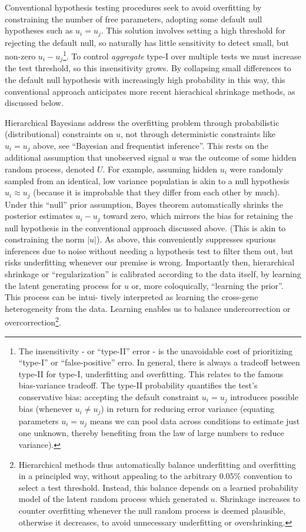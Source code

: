 \documentclass{article}
\begin{document}
Conventional hypothesis testing procedures seek to avoid overfitting by constraining the number of free parameters, adopting some default null hypotheses such as $u_i=u_j$. This solution involves setting a high threshold for rejecting the default null, so naturally has little sensitivity to detect small, but non-zero $u_i-u_j$\footnote{The insensitivity - or ``type-II'' error - is the unavoidable cost of prioritizing ``type-I''  or ``false-positive'' erro. In general, there is always a tradeoff between type-II for type-I, underfitting and overfitting. This relates to the famous bias-variance tradeoff. The type-II probability quantifies the test's conservative bias: accepting the default constraint $u_i=u_j$  introduces possible bias (whenever $u_i \neq u_j$) in return for reducing error variance (equating parameters $u_i=u_j$ means we can pool data across conditions to estimate just one unknown, thereby benefiting from the law of large numbers to reduce variance).}. To control \textit{aggregate} type-I over multiple tests we must increase the test threshold, so this insensitivity grows. By collapsing small differences to the default null hypothesis with increasingly high probability in this way, this conventional approach anticipates more recent hierachical shrinkage methods, as discussed below.

Hierarchical Bayesians address the overfitting problem through probabilistic (distributional) constraints on $u$, not through deterministic constraints like $u_i=u_j$ above, see ``Bayesian and frequentist inference''. This rests on the additional assumption that unobserved signal $u$ was the outcome of some hidden random process, denoted $U$. For example, assuming hidden $u_i$ were randomly sampled from an identical, low variance populatian is akin to a null hypothesis $u_i \approx u_j$ (because it is improbable that they differ from each other by much). Under this ``null'' prior assumption, Bayes theorem automatically shrinks the posterior estimates $u_i-u_j$ toward zero, which mirrors the bias for retaining the null hypothesis in the conventional approach discussed above. (This is akin to constraining the norm $|u|$). As above, this conveniently suppresses spurious inferences due to noise without needing a hypothesis test to filter them out, but risks underfitting whenever our premise is wrong. Importantly then, hierarchical shrinkage or ``regularization'' is calibrated according to the data itself, by learning the latent generating process for $u$  or, more coloquically, ``learning the prior''. This process can be intui- tively interpreted as learning the cross-gene heterogeneity from the data. Learning enables us to balance undercorrection or overcorrection\footnote{Hierarchical methods thus automatically balance underfitting and overfitting in a principled way, without appealing to the arbitrary $0.05\%$ convention to select a test threshold. Instead, this balance depends on a learned probability model of the latent random process which generated $u$. Shrinkage increases to counter overfitting whenever the null random process is deemed plausible, otherwise it decreases, to avoid unnecessary underfitting or overshrinking.}.
\end{document}
